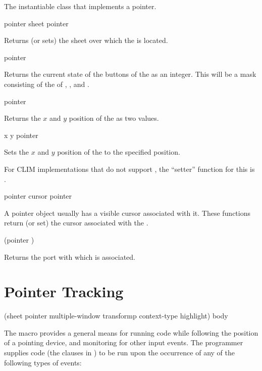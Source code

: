 
The instantiable class that implements a pointer.

 {pointer}
 {sheet pointer}

Returns (or sets) the sheet over which the   is located.

 {pointer}

Returns the current state of the buttons of the   as
an integer.  This will be a mask consisting of the  of
, , and
.

 {pointer}

Returns the $x$ and $y$ position of the   as two
values.

 {x y pointer}

Sets the $x$ and $y$ position of the   to the
specified position.

For CLIM implementations that do not support , the ``setter'' function
for this is .

 {pointer}
 {cursor pointer}

A pointer object usually has a visible cursor associated with it.  These
functions return (or set) the cursor associated with the 
.

 {(pointer )}

Returns the port with which  is associated.


\section {Pointer Tracking}

 {(sheet \key pointer multiple-window
                                          transformp context-type highlight)
                              \body body}

The  macro provides a general means for running code while
following the position of a pointing device, and monitoring for other input
events.  The programmer supplies code (the clauses in ) to be run upon
the occurrence of any of the following types of events:

